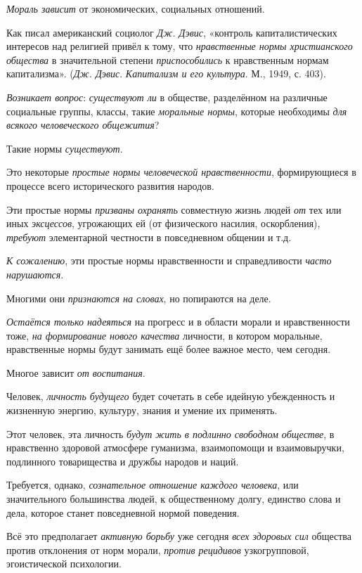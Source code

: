 \documentclass[a4paper,14pt,russian]{extreport}
\begin{document}
\emph{Мораль зависит} от экономических, социальных отношений.

Как писал американский социолог \emph{Дж. Дэвис}, «контроль капиталистических интересов над религией привёл к тому, что \emph{нравственные нормы христианского общества} в значительной степени \emph{приспособились} к нравственным нормам капитализма». (\emph{Дж. Дэвис}. \emph{Капитализм и его культура}. М., 1949, с. 403).

\emph{Возникает вопрос}: \emph{существуют ли} в обществе, разделённом на различные социальные группы, классы, такие \emph{моральные нормы}, которые необходимы \emph{для всякого человеческого общежития}?

Такие нормы \emph{существуют}.

Это некоторые \emph{простые нормы человеческой нравственности}, формирующиеся в процессе всего исторического развития народов.

Эти простые нормы \emph{призваны охранять} совместную жизнь людей \emph{от} тех или иных \emph{эксцессов}, угрожающих ей (от физического насилия, оскорбления), \emph{требуют} элементарной честности в повседневном общении и т.д.

\emph{К сожалению}, эти простые нормы нравственности и справедливости \emph{часто нарушаются}.

Многими они \emph{признаются на словах}, но попираются на деле.

\emph{Остаётся только надеяться} на прогресс и в области морали и нравственности тоже, \emph{на формирование нового качества} личности, в котором моральные, нравственные нормы будут занимать ещё более важное место, чем сегодня.

Многое зависит \emph{от воспитания}.

Человек, \emph{личность будущего} будет сочетать в себе идейную убежденность и жизненную энергию, культуру, знания и умение их применять.

Этот человек, эта личность \emph{будут жить в подлинно свободном обществе}, в нравственно здоровой атмосфере гуманизма, взаимопомощи и взаимовыручки, подлинного товарищества и дружбы народов и наций.

Требуется, однако, \emph{сознательное отношение каждого человека}, или значительного большинства людей, к общественному долгу, единство слова и дела, которое станет повседневной нормой поведения.

Всё это предполагает \emph{активную борьбу} уже сегодня \emph{всех здоровых сил} общества против отклонения от норм морали, \emph{против рецидивов} узкогрупповой, эгоистической психологии.
\end{document}
